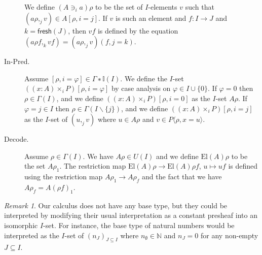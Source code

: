 \documentclass[english]{PaperTools/latex/entcs}
\theoremstyle{plain}
\theoremstyle{definition}
\theoremstyle{remark}
\newtheorem*{remark}{Remark}
\newcommand\CTimes[2]{(#2) ×_{#1}}
\newcommand\op[1]{∋_{#1}}
\def\fresh#1{\mathsf{fresh}(#1)}
\def\El#1{\mathrm{El}(#1)}
\begin{document}
\begin{description}
    We define $(A \op {i} a)ρ$ to be the set of $I$-elements $v$ such that
    $(aρ,_j v) ∈ A[ρ,i=j]$.
    If $v$ is such an element and $f : I → J$ and $k=\fresh J$, then
    $vf$ is defined by the equation $(aρf,_k vf) = (aρ ,_j v)(f, j=k)$.


  \item[\sc In-Pred.]
    Assume $[ρ,i=φ] ∈ Γ∗𝕀(I)$.  We define the $I$-set $(\CTimes i {x:A} P)[ρ,i=φ]$
    by case analysis on $φ ∈ I∪\{0\}$.
    If $φ = 0$ then $ρ ∈ Γ(I)$, and we define $(\CTimes i {x:A} P)[ρ,i=0]$ as
    the $I$-set $Aρ$.
    If $φ = j ∈ I$ then $ρ ∈ Γ(I\backslash\{j\})$, and we define
    $(\CTimes i {x:A} P)[ρ,i=j]$ as the $I$-set of $(u ,_j v)$ where
    $u ∈ Aρ$ and $v ∈ P⟨ρ,x=u⟩$.


  \item[\sc Decode.]
    Assume $ρ ∈ Γ(I)$.  We have $Aρ ∈ U(I)$ and we define
    $\El{A}ρ$ to be the set $Aρ_1$.
    The restriction map $\El{A}ρ → \El{A}ρf$, $u ↦ uf$ is defined
    using the restriction map $Aρ_1 → Aρ_f$ and the fact that we have
    $Aρ_f = A(ρf)_1$.
\end{description}

\begin{remark}
  Our calculus does not have any base type, but they could be interpreted
  by modifying their usual interpretation as a constant presheaf into an
  isomorphic $I$-set.
  For instance, the base type of natural numbers would be interpreted as
  the $I$-set of $(n_J)_{J ⊆ I}$ where $n_∅ ∈ ℕ$ and $n_J = 0$ for any
  non-empty $J ⊆ I$.
\end{remark}
\end{document}
